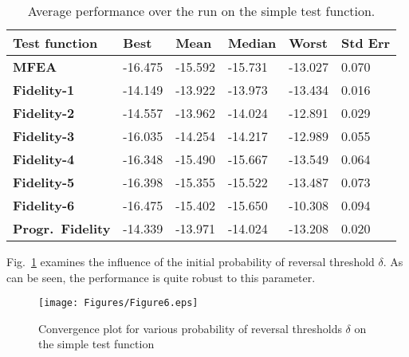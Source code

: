 \begin{table}[!ht]\footnotesize
	\centering
	\caption{Average performance over the run on the simple test function.}
	\label{tab:simpleArea}
	\begin{tabular}{l|l|l|l|l|l}
		\hline
		\textbf{Test function}        & \textbf{Best} & \textbf{Mean} & \textbf{Median} & \textbf{Worst} & \textbf{Std Err} \\ \hline
		\textbf{MFEA}           & -16.475       & -15.592       & -15.731         & -13.027        & 0.070        \\ 
		\textbf{Fidelity-1}           & -14.149       & -13.922       & -13.973         & -13.434        & 0.016        \\ 
		\textbf{Fidelity-2}           & -14.557       & -13.962       & -14.024         & -12.891        & 0.029        \\ 
		\textbf{Fidelity-3}           & -16.035       & -14.254       & -14.217         & -12.989        & 0.055        \\ 
		\textbf{Fidelity-4}           & -16.348       & -15.490       & -15.667         & -13.549        & 0.064        \\ 
		\textbf{Fidelity-5}           & -16.398       & -15.355       & -15.522         & -13.487        & 0.073        \\ 
		\textbf{Fidelity-6}           & -16.475       & -15.402       & -15.650         & -10.308        & 0.094        \\ 
		\textbf{Progr.\ Fidelity} & -14.339       & -13.971       & -14.024         & -13.208        & 0.020        \\ \hline
	\end{tabular}
\end{table}


Fig.~\ref{fig:prconvergence} examines the influence of the initial probability of reversal threshold $\delta$. As can be seen, the performance is quite robust to this parameter.

\begin{figure}[!htb]
	\centering
	\texttt{[image: Figures/Figure6.eps]}
	\caption{Convergence plot for various probability of reversal thresholds $\delta$ on the simple test function}
	\label{fig:prconvergence}
\end{figure} 

